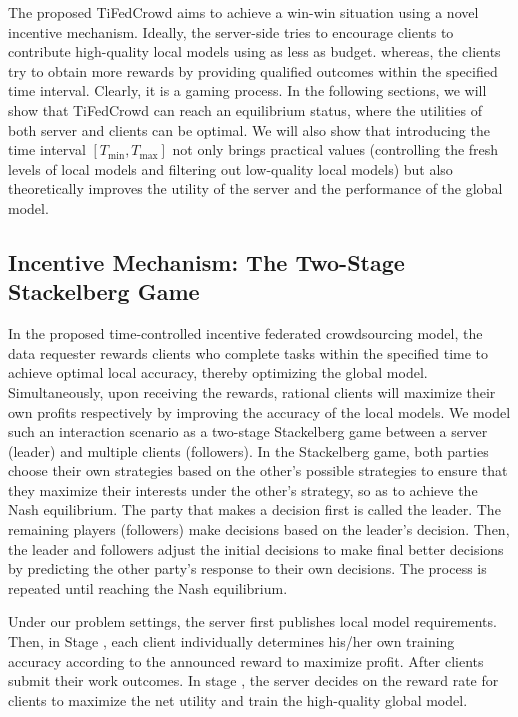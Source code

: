 \documentclass[final,1p,times]{elsarticle}
\begin{document}
The proposed TiFedCrowd aims to achieve a win-win situation using a novel incentive mechanism. Ideally, the server-side tries to encourage clients to contribute high-quality local models using as less as budget. whereas, the clients try to obtain more rewards by providing qualified outcomes within the specified time interval. Clearly, it is a gaming process. In the following sections, we will show that TiFedCrowd can reach an equilibrium status, where the utilities of both server and clients can be optimal. We will also show that introducing the time interval $[T_{\min}, T_{\max}]$ not only brings practical values (controlling the fresh levels of local models and filtering out low-quality local models) but also theoretically improves the utility of the server and the performance of the global model.

\subsection{Incentive Mechanism: The Two-Stage Stackelberg Game}
In the proposed time-controlled incentive federated crowdsourcing model, the data requester rewards clients who complete tasks within the specified time to achieve optimal local accuracy, thereby optimizing the global model. Simultaneously, upon receiving the rewards, rational clients will maximize their own profits respectively by improving the accuracy of the local models. We model such an interaction scenario as a two-stage Stackelberg game between a server (leader) and multiple clients (followers). In the Stackelberg game, both parties choose their own strategies based on the other's possible strategies to ensure that they maximize their interests under the other's strategy, so as to achieve the Nash equilibrium. The party that makes a decision first is called the leader. The remaining players (followers) make decisions based on the leader's decision. Then, the leader and followers adjust the initial decisions to make final better decisions by predicting the other party's response to their own decisions. The process is repeated until reaching the Nash equilibrium. 

Under our problem settings, the server first publishes local model requirements. Then, in Stage \uppercase\expandafter{}, each client individually determines his/her own training accuracy according to the announced reward to maximize profit. After clients submit their work outcomes. In stage \uppercase\expandafter{}, the server decides on the reward rate for clients to maximize the net utility and train the high-quality global model.
\end{document}
